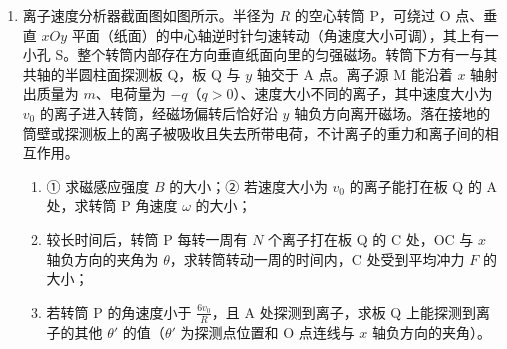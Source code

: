 \documentclass[\gkver]{gaokaozhenti}
\begin{document}
\begin{enumerate}
\item
离子速度分析器截面图如图所示。半径为 $R$ 的空心转筒 P，可绕过 O 点、垂直 $xOy$ 平面（纸面）的中心轴逆时针匀速转动（角速度大小可调），其上有一小孔 S。整个转筒内部存在方向垂直纸面向里的匀强磁场。转筒下方有一与其共轴的半圆柱面探测板 Q，板 Q 与 $y$ 轴交于 A 点。离子源 M 能沿着 $x$ 轴射出质量为 $m$、电荷量为 $-q$（$q > 0$）、速度大小不同的离子，其中速度大小为 $v_{0}$ 的离子进入转筒，经磁场偏转后恰好沿 $y$ 轴负方向离开磁场。落在接地的筒壁或探测板上的离子被吸收且失去所带电荷，不计离子的重力和离子间的相互作用。
\begin{enumerate}
	\item
	① 求磁感应强度 $B$ 的大小；② 若速度大小为 $v_{0}$ 的离子能打在板 Q 的 A 处，求转筒 P 角速度 $\omega$ 的大小；
	\item
	较长时间后，转筒 P 每转一周有 $N$ 个离子打在板 Q 的 C 处，OC 与 $x$ 轴负方向的夹角为 $\theta$，求转筒转动一周的时间内，C 处受到平均冲力 $F$ 的大小；
	\item
	若转筒 P 的角速度小于 $\frac{6v_{0}}{R}$，且 A 处探测到离子，求板 Q 上能探测到离子的其他 $\theta'$ 的值（$\theta'$ 为探测点位置和 O 点连线与 $x$ 轴负方向的夹角）。
\end{enumerate}

\end{enumerate}
\end{document}
